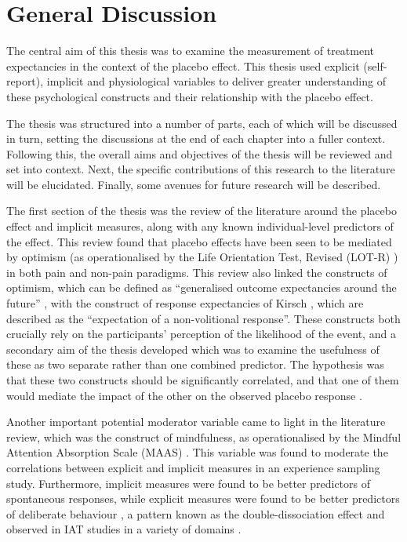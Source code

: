 

\section{General Discussion}

The central aim of this thesis was to examine the measurement of
treatment expectancies in the context of the placebo effect. This
thesis used explicit (self-report), implicit and physiological
variables to deliver greater understanding of these psychological
constructs and their relationship with the placebo effect.


The thesis was structured into a number of parts, each of which will
be discussed in turn, setting the discussions at the end of each
chapter into a fuller context. Following this, the overall aims and
objectives of the thesis will be reviewed and set into context. Next,
the specific contributions of this research to the literature will be
elucidated. Finally, some avenues for future research will be
described.

The first section of the thesis was the review of the literature
around the placebo effect and implicit measures, along with any known
individual-level predictors of the effect. This review found that
placebo effects have been seen to be mediated by optimism (as
operationalised by the Life Orientation Test, Revised (LOT-R)
\cite{Scheier1994}) \cite{Geers2005,morton2009reproducibility} in both
pain and non-pain paradigms. This review also linked the constructs of
optimism, which can be defined as ``generalised outcome expectancies
around the future'' \cite{Carver2010}, with the construct of response
expectancies of Kirsch \cite{Kirsch1985,Kirsch1997}, which are
described as the ``expectation of a non-volitional response''. These
constructs both crucially rely on the participants' perception of the
likelihood of the event, and a secondary aim of the thesis developed
which was to examine the usefulness of these as two separate rather
than one combined predictor. The hypothesis was that these two
constructs should be significantly correlated, and that one of them
would mediate the impact of the other on the observed placebo response
\cite{Geers2005}.

Another important potential moderator variable came to light in the
literature review, which was the construct of mindfulness, as
operationalised by the Mindful Attention Absorption Scale (MAAS)
\cite{brown2003benefits}. This variable was found to moderate the
correlations between explicit and implicit measures in an experience
sampling study. Furthermore, implicit measures were found to be better
predictors of spontaneous responses, while explicit measures were
found to be better predictors of deliberate behaviour
\cite{Levesque2007}, a pattern known as the double-dissociation effect
and observed in IAT studies in a variety of domains
\cite{Asendorpf2002,Perugini2005,Grumm2007,Steffens2006}.

